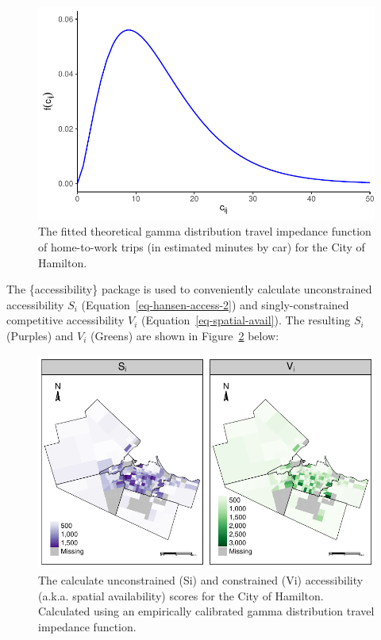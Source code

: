 \documentclass[12pt, oneside]{report}
\begin{document}
\begin{figure}

{\centering \includegraphics{tools-report_files/figure-pdf/fig-gamma-1.pdf}

}

\caption{\label{fig-gamma}The fitted theoretical gamma distribution
travel impedance function of home-to-work trips (in estimated minutes by
car) for the City of Hamilton.}

\end{figure}

The \{accessibility\} package is used to conveniently calculate
unconstrained accessibility \(S_i\) (Equation~\ref{eq-hansen-access-2})
and singly-constrained competitive accessibility \(V_i\)
(Equation~\ref{eq-spatial-avail}). The resulting \(S_i\) (Purples) and
\(V_i\) (Greens) are shown in
Figure~\ref{fig-raw-con-and-unconstrained-access} below:

\begin{figure}

{\centering \includegraphics{tools-report_files/figure-pdf/fig-raw-con-and-unconstrained-access-1.pdf}

}

\caption{\label{fig-raw-con-and-unconstrained-access}The calculate
unconstrained (Si) and constrained (Vi) accessibility (a.k.a. spatial
availability) scores for the City of Hamilton. Calculated using an
empirically calibrated gamma distribution travel impedance function.}

\end{figure}
\end{document}
